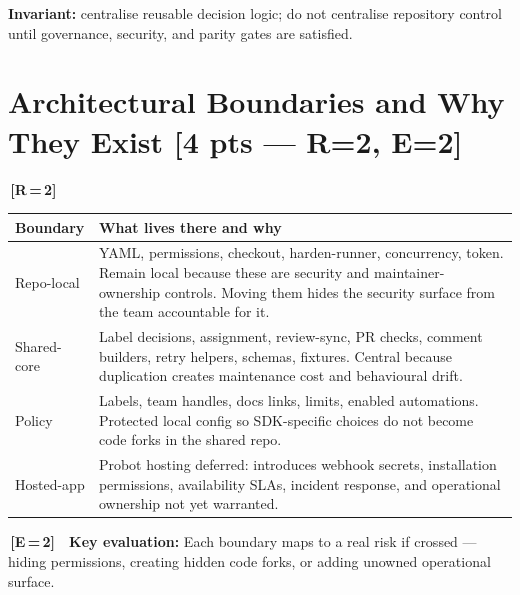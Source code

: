 \documentclass[9pt, a4paper]{article}
\newcommand{\ic}[2]{%
  {\colorbox{tag#1}{\color{white}\bfseries\fontsize{5.5}{6.5}\selectfont\,[#1\,=\,#2]\,}}%
}
\DeclareRobustCommand{\mb}[1]{%
  \texorpdfstring{\hfill{\fontsize{6.5}{7}\selectfont\color{hieroGray}[#1]}}{}%
}
\newcommand{\tsize}{\fontsize{7.8}{9.5}\selectfont}
\begin{document}
\begin{multicols}{2}
\begin{invariantbox}
\fontsize{7.5}{9}\selectfont
\textbf{Invariant:} centralise reusable decision logic; do not centralise repository control
until governance, security, and parity gates are satisfied.
\end{invariantbox}

\section{Architectural Boundaries and Why They Exist \mb{4 pts — R=2, E=2}}

\ic{R}{2}

\vspace{1pt}
{\tsize
\begin{tabularx}{\linewidth}{@{}L{1.85cm}X@{}}
\toprule
\textbf{Boundary} & \textbf{What lives there and why} \\
\midrule
Repo-local &
  YAML, permissions, checkout, harden-runner, concurrency, token. Remain local because these
  are security and maintainer-ownership controls. Moving them hides the security surface
  from the team accountable for it. \\
Shared-core &
  Label decisions, assignment, review-sync, PR checks, comment builders, retry helpers,
  schemas, fixtures. Central because duplication creates maintenance cost and behavioural drift. \\
Policy &
  Labels, team handles, docs links, limits, enabled automations. Protected local config so
  SDK-specific choices do not become code forks in the shared repo. \\
Hosted-app &
  Probot hosting deferred: introduces webhook secrets, installation permissions, availability
  SLAs, incident response, and operational ownership not yet warranted. \\
\bottomrule
\end{tabularx}}

\vspace{1pt}
\begin{invariantbox}
\fontsize{7.5}{9}\selectfont
\ic{E}{2}\ \textbf{Key evaluation:} Each boundary maps to a real risk if crossed — hiding
permissions, creating hidden code forks, or adding unowned operational surface.
\end{invariantbox}

\columnbreak


\end{multicols}
\end{document}
